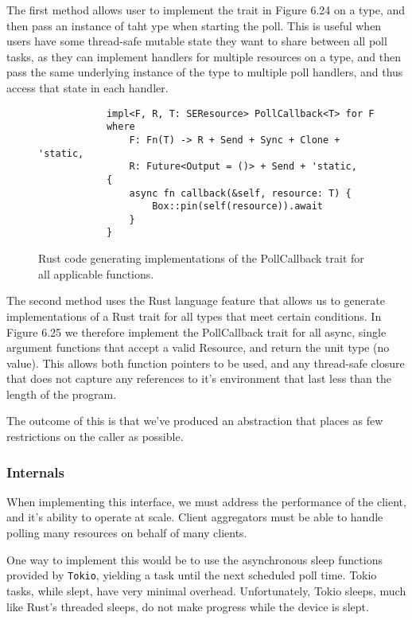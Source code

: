 The first method allows user to implement the trait in Figure 6.24 on a type, and then pass an instance of taht ype when starting the poll.
This is useful when users have some thread-safe mutable state they want to share between all poll tasks, as they can implement handlers for multiple resources on a type, and then pass the same underlying instance of the type to multiple poll handlers, and thus access that state in each handler.


\begin{figure}[h]
    \begin{center}
        \begin{lstlisting}
            impl<F, R, T: SEResource> PollCallback<T> for F
            where
                F: Fn(T) -> R + Send + Sync + Clone + 'static,
                R: Future<Output = ()> + Send + 'static,
            {
                async fn callback(&self, resource: T) {
                    Box::pin(self(resource)).await
                }
            }            
        \end{lstlisting}
        \label{fig:pollimplgen}
        \vspace{-10pt}
        \caption{Rust code generating implementations of the PollCallback trait for all applicable functions.}
    \end{center}
\end{figure}

The second method uses the Rust language feature that allows us to generate implementations of a Rust trait for all types that meet certain conditions. In Figure 6.25 we therefore implement the PollCallback trait for all async, single argument functions that accept a valid Resource, and return the unit type (no value).
This allows both function pointers to be used, and any thread-safe closure that does not capture any references to it's environment that last less than the length of the program.

The outcome of this is that we've produced an abstraction that places as few restrictions on the caller as possible.

\subsubsection{Internals}
When implementing this interface, we must address the performance of the client, and it's ability to operate at scale. Client aggregators must be able to handle polling many resources on behalf of many clients.

One way to implement this would be to use the asynchronous sleep functions provided by \texttt{Tokio}, yielding a  task until the next scheduled poll time. Tokio tasks, while slept, have very minimal overhead. Unfortunately, Tokio sleeps, much like Rust's threaded sleeps, do not make progress while the device is slept. 

